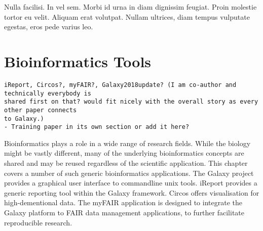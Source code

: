 \begin{savequote}[75mm]
Nulla facilisi. In vel sem. Morbi id urna in diam dignissim feugiat. Proin molestie tortor eu velit. Aliquam erat volutpat. Nullam ultrices, diam tempus vulputate egestas, eros pede varius leo.
\end{savequote}

\chapter{Bioinformatics Tools}
\label{chapter:general}
\setcounter{figure}{-1}
\setcounter{table}{-1}
\setcounter{section}{-1}
\setcounter{NAT@ctr}{-1}

\begin{verbatim}
iReport, Circos?, myFAIR?, Galaxy2018update? (I am co-author and technically everybody is
shared first on that? would fit nicely with the overall story as every other paper connects
to Galaxy.)
- Training paper in its own section or add it here?
\end{verbatim}

Bioinformatics plays a role in a wide range of research fields. While the biology might be vastly different, many of the underlying bioinformatics concepts are shared and may be reused regardless of the scientific application. This chapter covers a number of such generic bioinformatics applications. The Galaxy project provides a graphical user interface to commandline unix tools. iReport provides a generic reporting tool within the Galaxy framework. Circos offers visualisation for high-dementional data. The myFAIR application is designed to integrate the Galaxy platform to FAIR data management applications, to further facilitate reproducible research.
